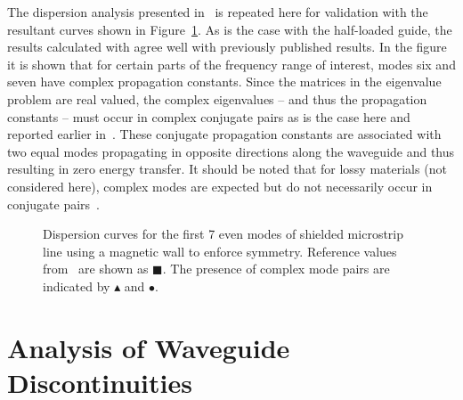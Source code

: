 The dispersion analysis presented in~\cite{PelCoc1998} is repeated
here for validation with the resultant curves shown in
Figure~\ref{lezar:fig:shielded_microstrip_dispersion_curves}. As is the case
with the half-loaded guide, the results calculated with \fenics{}
agree well with previously published results. In the figure it is
shown that for certain parts of the frequency range of interest, modes
six and seven have complex propagation constants. Since the matrices
in the eigenvalue problem are real valued, the complex eigenvalues --
and thus the propagation constants -- must occur in complex conjugate
pairs as is the case here and reported earlier
in~\cite{HuaIto1988}. These conjugate propagation constants are
associated with two equal modes propagating in opposite directions
along the waveguide and thus resulting in zero energy transfer. It
should be noted that for lossy materials (not considered here),
complex modes are expected but do not necessarily occur in conjugate
pairs~\cite{PelCoc1998}.
\begin{figure}[h]
 \centering
 \caption{Dispersion curves for the first 7 even modes of shielded microstrip line using a magnetic wall to enforce symmetry.  Reference values from~\cite{PelCoc1998} are shown as $\blacksquare$.  The presence of complex mode pairs are indicated by $\blacktriangle$ and $\bullet$.}
 \label{lezar:fig:shielded_microstrip_dispersion_curves}
\end{figure}
\label{lezar:sec:shielded_microstrip|)}
\section{Analysis of Waveguide Discontinuities}
\label{lezar:sec:waveguide_discontinuities}


